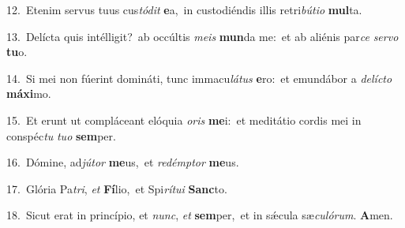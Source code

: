{\numbfont\textcolor{\numbcolor}{12.}}~Etenim servus tuus cus\-\textit{tó}\-\textit{dit} \textbf{e}\-a,~\star in custodiéndis illis retri\-\textit{bú}\-\textit{ti}\textit{o} \textbf{mul}\-ta.\par
{\numbfont\textcolor{\numbcolor}{13.}}~Delícta quis intélligit?~\dagger ab occúltis \textit{me}\-\textit{is} \textbf{mun}\-da me:~\star et ab aliénis par\textit{ce} \textit{ser}\-\textit{vo} \textbf{tu}\-o.\par
{\numbfont\textcolor{\numbcolor}{14.}}~Si mei non fúerint domináti, tunc immacu\-\textit{lá}\-\textit{tus} \textbf{e}\-ro:~\star et emundábor a \textit{de}\-\textit{líc}\textit{to} \textbf{má}\-\textbf{xi}mo.\par
{\numbfont\textcolor{\numbcolor}{15.}}~Et erunt ut compláceant elóquia \textit{o}\-\textit{ris} \textbf{me}\-i:~\star et meditátio cordis mei in conspéc\textit{tu} \textit{tu}\-\textit{o} \textbf{sem}\-per.\par
{\numbfont\textcolor{\numbcolor}{16.}}~Dómine, ad\-\textit{jú}\-\textit{tor} \textbf{me}\-us,~\star et \textit{red}\-\textit{émp}\textit{tor} \textbf{me}\-us.\par
{\numbfont\textcolor{\numbcolor}{17.}}~Glória Pa\-\textit{tri}\-, \textit{et} \textbf{Fí}\-lio,~\star et Spi\-\textit{rí}\-\textit{tu}\textit{i} \textbf{Sanc}\-to.\par
{\numbfont\textcolor{\numbcolor}{18.}}~Sicut erat in princípio, et \textit{nunc}\-, \textit{et} \textbf{sem}\-per,~\star et in sǽcula sæ\-\textit{cu}\-\textit{ló}\textit{rum}. \textbf{A}\-men.\par
